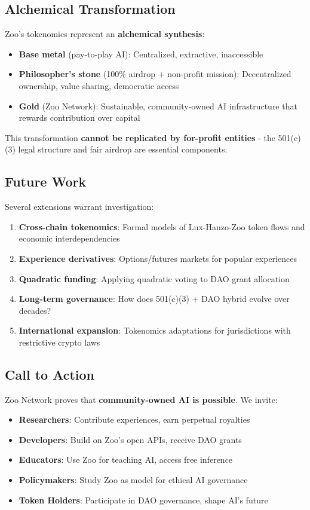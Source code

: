 \documentclass[11pt,letterpaper]{article}
\theoremstyle{definition}
\theoremstyle{remark}
\begin{document}
\subsection{Alchemical Transformation}

Zoo's tokenomics represent an \textbf{alchemical synthesis}:
\begin{itemize}
\item \textbf{Base metal} (pay-to-play AI): Centralized, extractive, inaccessible
\item \textbf{Philosopher's stone} (100\% airdrop + non-profit mission): Decentralized ownership, value sharing, democratic access
\item \textbf{Gold} (Zoo Network): Sustainable, community-owned AI infrastructure that rewards contribution over capital
\end{itemize}

This transformation \textbf{cannot be replicated by for-profit entities} - the 501(c)(3) legal structure and fair airdrop are essential components.

\subsection{Future Work}

Several extensions warrant investigation:

\begin{enumerate}
\item \textbf{Cross-chain tokenomics}: Formal models of Lux-Hanzo-Zoo token flows and economic interdependencies
\item \textbf{Experience derivatives}: Options/futures markets for popular experiences
\item \textbf{Quadratic funding}: Applying quadratic voting to DAO grant allocation
\item \textbf{Long-term governance}: How does 501(c)(3) + DAO hybrid evolve over decades?
\item \textbf{International expansion}: Tokenomics adaptations for jurisdictions with restrictive crypto laws
\end{enumerate}

\subsection{Call to Action}

Zoo Network proves that \textbf{community-owned AI is possible}. We invite:
\begin{itemize}
\item \textbf{Researchers}: Contribute experiences, earn perpetual royalties
\item \textbf{Developers}: Build on Zoo's open APIs, receive DAO grants
\item \textbf{Educators}: Use Zoo for teaching AI, access free inference
\item \textbf{Policymakers}: Study Zoo as model for ethical AI governance
\item \textbf{Token Holders}: Participate in DAO governance, shape AI's future
\end{itemize}
\end{document}
